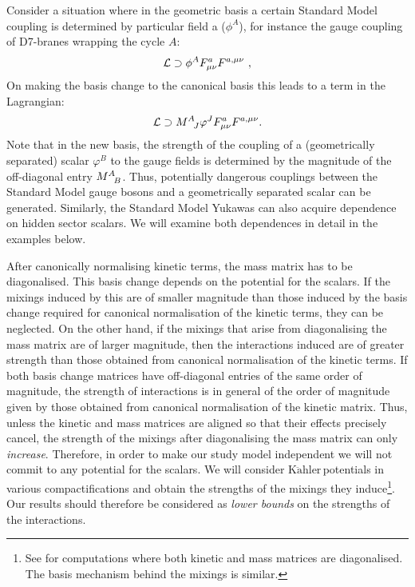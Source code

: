 \documentclass[11pt,a4paper]{article}
\newcommand{\Kahler}{\ensuremath{\text{K}\ddot{\text{a}}\text{hler}\,}}
\begin{document}
Consider a situation where in the geometric basis a certain Standard Model coupling is determined by particular field a ($\phi^A$), for instance the gauge coupling of D7-branes wrapping the cycle $A$:
%
\begin{equation}
\label{eq:CouplingGaugeQ}
{ \mathcal{L} } \supset  \phi^{\large{A}} F^{a}_{\mu \nu} F^{a, \mu \nu} \ ,
\end{equation}
%
On making the basis change to the canonical basis this leads to a term in the Lagrangian:
%
%
\begin{equation}
{ \mathcal{L} } \supset  M^{\large{A}}_{\phantom{A}J} \varphi^{J} F^{a}_{\mu \nu} F^{a, \mu \nu}.
\end{equation}
%
Note that in the new basis, the strength of the coupling of a (geometrically separated) scalar $\varphi^{B}$ to the gauge fields is determined by the magnitude of the off-diagonal entry $M^{\large{A}}_{\phantom{A}B}$. Thus, potentially dangerous couplings
between the Standard Model gauge bosons and a geometrically separated scalar can be generated. Similarly, the Standard Model Yukawas can also acquire dependence on hidden sector scalars. We will examine both dependences in detail in the examples below.

After canonically normalising kinetic terms, the  mass matrix has to be diagonalised. This basis change depends on the potential for the scalars. If the mixings induced by this are of smaller magnitude than those induced by the basis change required for canonical normalisation of the kinetic terms, they can be neglected. On the other hand, if the mixings that arise from diagonalising the mass matrix are of larger magnitude, then the interactions induced are of greater strength than those obtained from  canonical normalisation of the kinetic terms. If both basis change matrices have off-diagonal entries of the same order of magnitude, the strength of interactions is in general of the order of magnitude given by those obtained from canonical normalisation of the kinetic matrix. Thus, unless the kinetic and mass matrices are aligned so that their effects precisely cancel, the strength of the mixings
after diagonalising the mass matrix can only \textit{increase}. Therefore, in order to make our study model independent we will not commit to any potential for the scalars. We will consider \Kahler potentials in various compactifications and obtain the strengths of the mixings they induce\footnote{See \cite{Conlon:2007gk, Cicoli:2010ha} for computations where both kinetic and mass matrices are diagonalised. The basis mechanism behind the mixings is similar.}. Our results should therefore be considered as {\it lower bounds} on the strengths of the interactions.
\end{document}
